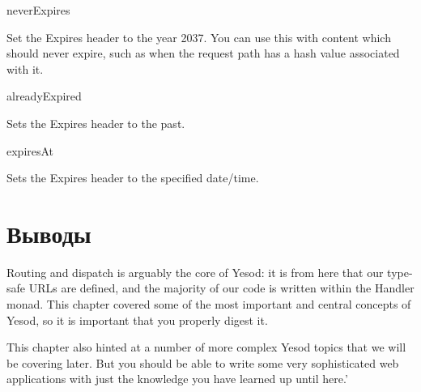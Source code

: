 neverExpires

Set the Expires header to the year 2037. You can use this with content
which should never expire, such as when the request path has a hash
value associated with it.

alreadyExpired

Sets the Expires header to the past.

expiresAt

Sets the Expires header to the specified date/time.

\section{Выводы}

Routing and dispatch is arguably the core of Yesod: it is from here
that our type-safe URLs are defined, and the majority of our code is
written within the Handler monad. This chapter covered some of the
most important and central concepts of Yesod, so it is important that
you properly digest it.

This chapter also hinted at a number of more complex Yesod topics that
we will be covering later. But you should be able to write some very
sophisticated web applications with just the knowledge you have
learned up until here.'
